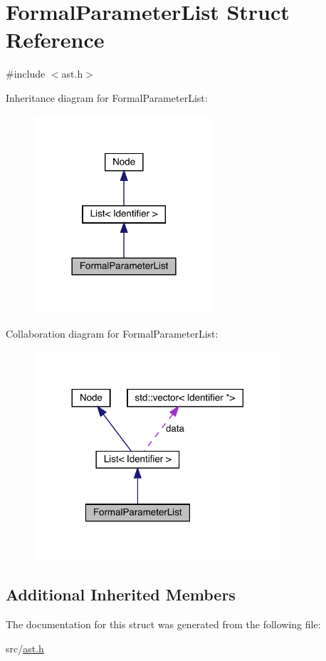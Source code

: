 \hypertarget{struct_formal_parameter_list}{}\section{Formal\+Parameter\+List Struct Reference}
\label{struct_formal_parameter_list}


{\ttfamily \#include $<$ast.\+h$>$}



Inheritance diagram for Formal\+Parameter\+List\+:
\nopagebreak
\begin{figure}[H]
\begin{center}
\leavevmode
\includegraphics[width=189pt]{struct_formal_parameter_list__inherit__graph}
\end{center}
\end{figure}


Collaboration diagram for Formal\+Parameter\+List\+:
\nopagebreak
\begin{figure}[H]
\begin{center}
\leavevmode
\includegraphics[width=260pt]{struct_formal_parameter_list__coll__graph}
\end{center}
\end{figure}
\subsection*{Additional Inherited Members}


The documentation for this struct was generated from the following file\+:\begin{DoxyCompactItemize}
\item 
src/\hyperlink{ast_8h}{ast.\+h}\end{DoxyCompactItemize}
